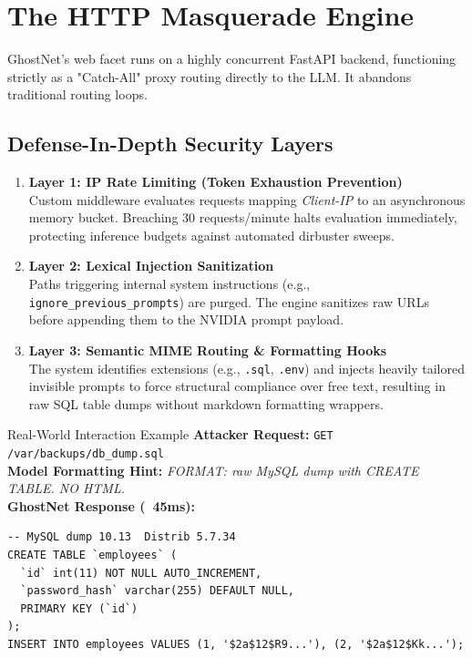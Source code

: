 \documentclass[11pt,a4paper]{report}
\begin{document}
\chapter{The HTTP Masquerade Engine}

GhostNet’s web facet runs on a highly concurrent FastAPI backend, functioning strictly as a "Catch-All" proxy routing directly to the LLM. It abandons traditional routing loops.

\section{Defense-In-Depth Security Layers}

\begin{enumerate}
    \item \textbf{Layer 1: IP Rate Limiting (Token Exhaustion Prevention)} \\
    Custom middleware evaluates requests mapping \textit{Client-IP} to an asynchronous memory bucket. Breaching 30 requests/minute halts evaluation immediately, protecting inference budgets against automated dirbuster sweeps.
    \item \textbf{Layer 2: Lexical Injection Sanitization} \\
    Paths triggering internal system instructions (e.g., \texttt{ignore\_previous\_prompts}) are purged. The engine sanitizes raw URLs before appending them to the NVIDIA prompt payload.
    \item \textbf{Layer 3: Semantic MIME Routing \& Formatting Hooks} \\
    The system identifies extensions (e.g., \texttt{.sql}, \texttt{.env}) and injects heavily tailored invisible prompts to force structural compliance over free text, resulting in raw SQL table dumps without markdown formatting wrappers.
\end{enumerate}

\begin{cyberbox}{Real-World Interaction Example}
\textbf{Attacker Request:} \texttt{GET /var/backups/db\_dump.sql} \\
\textbf{Model Formatting Hint:} \textit{FORMAT: raw MySQL dump with CREATE TABLE. NO HTML.} \\
\textbf{GhostNet Response (~45ms):}
\begin{verbatim}
-- MySQL dump 10.13  Distrib 5.7.34
CREATE TABLE `employees` (
  `id` int(11) NOT NULL AUTO_INCREMENT,
  `password_hash` varchar(255) DEFAULT NULL,
  PRIMARY KEY (`id`)
);
INSERT INTO employees VALUES (1, '$2a$12$R9...'), (2, '$2a$12$Kk...');
\end{verbatim}
\end{cyberbox}
\end{document}
